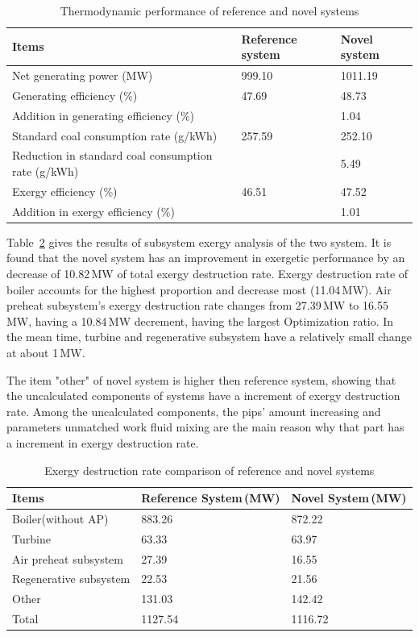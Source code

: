 \documentclass[preprint,12pt]{elsarticle}
\begin{document}
\begin{table}
\caption{Thermodynamic performance of reference and novel systems}
\label{table:thermal performance compare}
\centering
\begin{tabular}{p{7.5cm}p{1.75cm}p{1.75cm}}
\toprule 
Items & Reference system & Novel system\tabularnewline
\midrule
Net generating power (MW) & 999.10 & 1011.19\tabularnewline
Generating efficiency (\%) & 47.69 & 48.73\tabularnewline
Addition in generating efficiency (\%) &  & 1.04\tabularnewline
Standard coal consumption rate (g/kWh) & 257.59 & 252.10\tabularnewline
Reduction in standard coal consumption rate (g/kWh) &  & 5.49\tabularnewline
Exergy efficiency (\%) & 46.51 & 47.52\tabularnewline
Addition in exergy efficiency (\%) &  & 1.01\tabularnewline
\bottomrule
\end{tabular}
\end{table}
Table~\ref{table:system exergy campare} gives the results of subsystem exergy analysis of the two system. 
It is found that the novel system has an improvement in exergetic performance by an decrease of 10.82\,MW of total exergy destruction rate.
Exergy destruction rate of boiler accounts for the highest proportion and decrease most (11.04\,MW).
Air preheat subsystem's exergy destruction rate changes from 27.39\,MW to 16.55\,MW, having a 10.84\,MW decrement, having the largest Optimization ratio.
In the mean time, turbine and regenerative subsystem have a relatively small change at about 1\,MW. 

The item "other" of novel system is higher then reference system, showing that the uncalculated components of systems have a increment of exergy destruction rate.
Among the uncalculated components, the pips' amount increasing and  parameters unmatched work fluid mixing are the main reason why that part has a increment in exergy destruction rate.

\begin{table}
\caption{Exergy destruction rate comparison of reference and novel systems }
\label{table:system exergy campare}
\centering
\begin{tabular}{lll}
\toprule 
Items & Reference System\,(MW) & Novel System\,(MW)\tabularnewline
\midrule 
Boiler(without AP) & 883.26 & 872.22\tabularnewline
Turbine & 63.33 & 63.97\tabularnewline
Air preheat subsystem  & 27.39 & 16.55\tabularnewline
Regenerative subsystem & 22.53 & 21.56\tabularnewline
Other & 131.03 & 142.42 \tabularnewline
Total & 1127.54 & 1116.72\tabularnewline
\bottomrule
\end{tabular}
\end{table}
\end{document}
